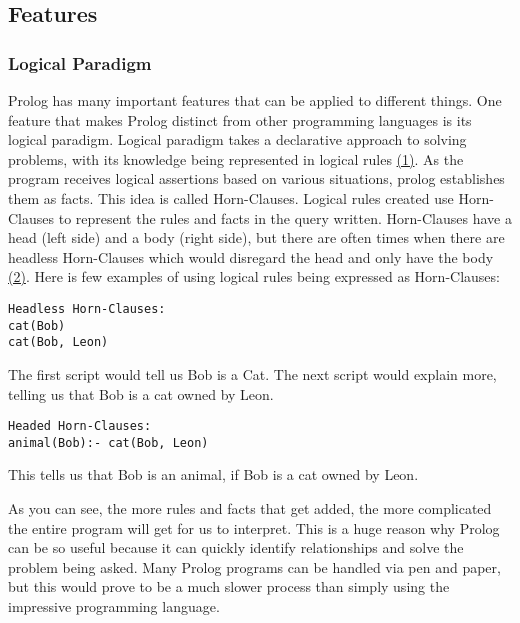 \documentclass{article}
\theoremstyle{theorem}
\theoremstyle{definition}
\theoremstyle{remark}
\begin{document}
\subsection{Features}

\subsubsection{Logical Paradigm}
\noindent\newline Prolog has many important features that can be applied to different things. One feature that makes Prolog distinct from other programming languages is its logical paradigm. Logical paradigm takes a declarative approach to solving problems, with its knowledge being represented in logical rules \href{https://www.cs.ucf.edu/~leavens/ComS541Fall97/hw-pages/paradigms/major.html}{(1)}. As the program receives logical assertions based on various situations, prolog establishes them as facts. This idea is called Horn-Clauses. Logical rules created use Horn-Clauses to represent the rules and facts in the query written. Horn-Clauses have a head (left side) and a body (right side), but there are often times when there are headless Horn-Clauses which would disregard the head and only have the body \href{https://athena.ecs.csus.edu/~mei/logicp/prolog.html}{(2)}. Here is few examples of using logical rules being expressed as Horn-Clauses:
\begin{verbatim}
Headless Horn-Clauses:
cat(Bob)
cat(Bob, Leon)
\end{verbatim}

\noindent\newline The first script would tell us Bob is a Cat. 
\noindent\newline The next script would explain more, telling us that Bob is a cat owned by Leon. 

\begin{verbatim}
Headed Horn-Clauses:
animal(Bob):- cat(Bob, Leon)
\end{verbatim}

\noindent\newline This tells us that Bob is an animal, if Bob is a cat owned by Leon. 


\noindent\newline As you can see, the more rules and facts that get added, the more complicated the entire program will get for us to interpret. This is a huge reason why Prolog can be so useful because it can quickly identify relationships and solve the problem being asked. Many Prolog programs can be handled via pen and paper, but this would prove to be a much slower process than simply using the impressive programming language. 
\end{document}

